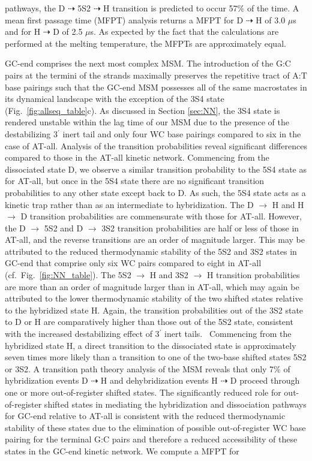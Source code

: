 \documentclass[journal=jpcbfk,manuscript=article]{achemso}
\begin{document}
pathways, the D $\dashrightarrow$ 5S2 $\dashrightarrow$ H transition is predicted to occur 57\% of the time. A mean first passage time (MFPT) analysis returns a MFPT for D $\dashrightarrow$ H of 3.0 $\mu$s and for H $\dashrightarrow$ D of 2.5 $\mu$s. As expected by the fact that the calculations are performed at the melting temperature, the MFPTs are approximately equal.  

GC-end comprises the next most complex MSM. The introduction of the G:C pairs at the termini of the strands maximally preserves the repetitive tract of A:T base pairings such that the GC-end MSM possesses all of the same macrostates in its dynamical landscape with the exception of the 3S4 state (Fig.~\ref{fig:allseq_table}c). As discussed in Section \ref{sec:NN}, the 3S4 state is rendered unstable within the lag time of our MSM due to the presence of the destabilizing 3$^\prime$ inert tail and only four WC base pairings compared to six in the case of AT-all. Analysis of the transition probabilities reveal significant differences compared to those in the AT-all kinetic network. Commencing from the dissociated state D, we observe a similar transition probability to the 5S4 state as for AT-all, but once in the 5S4 state there are no significant transition probabilities to any other state except back to D. As such, the 5S4 state acts as a kinetic trap rather than as an intermediate to hybridization. The D $\rightarrow$ H and H $\rightarrow$ D transition probabilities are commensurate with those for AT-all. However, the D $\rightarrow$ 5S2 and D $\rightarrow$ 3S2 transition probabilities are half or less of those in AT-all, and the reverse transitions are an order of magnitude larger. This may be attributed to the reduced thermodynamic stability of the 5S2 and 3S2 states in GC-end that comprise only six WC pairs compared to eight in AT-all (cf.\ Fig.~\ref{fig:NN_table}). The 5S2 $\rightarrow$ H and 3S2 $\rightarrow$ H transition probabilities are more than an order of magnitude larger than in AT-all, which may again be attributed to the lower thermodynamic stability of the two shifted states relative to the hybridized state H. Again, the transition probabilities out of the 3S2 state to D or H are comparatively higher than those out of the 5S2 state, consistent with the increased destabilizing effect of 3$^\prime$ inert tails.~\citep{Doktycz1990ThermodynamicC, Dickman2012ThermodynamicDNAs, DiMichele2014EffectHybridization} Commencing from the hybridized state H, a direct transition to the dissociated state is approximately seven times more likely than a transition to one of the two-base shifted states 5S2 or 3S2. A transition path theory analysis of the MSM reveals that only 7\% of hybridization events D $\dashrightarrow$ H and dehybridization events H $\dashrightarrow$ D proceed through one or more out-of-register shifted states. The significantly reduced role for out-of-register shifted states in mediating the hybridization and dissociation pathways for GC-end relative to AT-all is consistent with the reduced thermodynamic stability of these states due to the elimination of possible out-of-register WC base pairing for the terminal G:C pairs and therefore a reduced accessibility of these states in the GC-end kinetic network. We compute a MFPT for 
\end{document}

